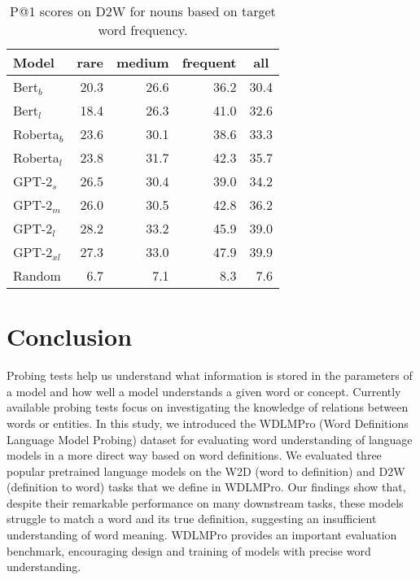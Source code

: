 \documentclass[11pt,a4paper]{article}
\begin{document}
\begin{table}
    \centering
    \begin{tabular}{l|rrrr}
    \hline
        \textbf{Model} & \multicolumn{1}{c}{\textbf{rare}} & \multicolumn{1}{c}{\textbf{medium}} & \multicolumn{1}{c}{\textbf{frequent}} & \multicolumn{1}{c}{\textbf{all}} \\ \hline
     Bert$_{b}$ & 20.3 & 26.6 & 36.2 & 30.4 \\
     Bert$_{l}$ & 18.4 & 26.3 & 41.0 & 32.6 \\
     Roberta$_{b}$ & 23.6 & 30.1 & 38.6 & 33.3 \\
     Roberta$_{l}$ & 23.8 & 31.7 & 42.3 & 35.7 \\ \hline
     GPT-2$_{s}$ & 26.5 & 30.4 & 39.0 & 34.2 \\
     GPT-2$_{m}$ & 26.0 & 30.5 & 42.8 & 36.2 \\
     GPT-2$_{l}$ & 28.2 & 33.2 & 45.9 & 39.0 \\
     GPT-2$_{xl}$ & 27.3 & 33.0 & 47.9 & 39.9 \\ \hline
     Random & 6.7 & 7.1 & 8.3 & 7.6 \\ \hline 
     
    \end{tabular}
    \caption{P@1 scores on D2W for  nouns based on target word frequency.}
    \label{tab:freq_results_find_the_word}
\end{table}


\section{Conclusion}

Probing tests help us understand what information
is stored in the parameters of a model and how well a model
understands a given word or concept. Currently available
probing tests focus on investigating the 
knowledge of relations between words or entities. In this study, we
introduced the WDLMPro (Word Definitions Language Model Probing)
dataset for evaluating word understanding of language models
in a more direct way based on word definitions. We evaluated
three popular pretrained language models on
the W2D (word to definition) and D2W (definition to word)
tasks that we define in
WDLMPro. Our findings show that, despite their remarkable
performance on many downstream tasks, these models struggle
to match a word and its true definition, suggesting an
insufficient understanding of word meaning. WDLMPro provides an
important evaluation benchmark, encouraging design and
training of models with precise word understanding.



\end{document}
